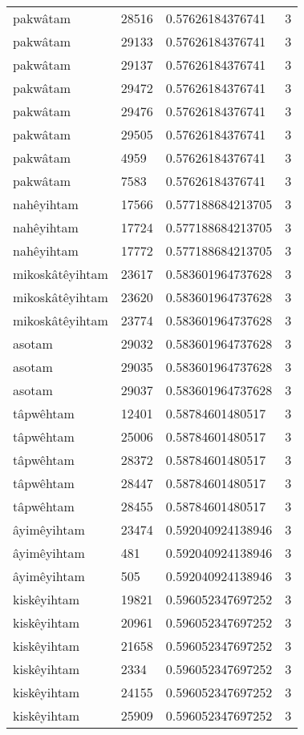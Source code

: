 \begin{longtable}{llll}
pakwâtam & 28516 & 0.57626184376741 & 3 \\
pakwâtam & 29133 & 0.57626184376741 & 3 \\
pakwâtam & 29137 & 0.57626184376741 & 3 \\
pakwâtam & 29472 & 0.57626184376741 & 3 \\
pakwâtam & 29476 & 0.57626184376741 & 3 \\
pakwâtam & 29505 & 0.57626184376741 & 3 \\
pakwâtam & 4959 & 0.57626184376741 & 3 \\
pakwâtam & 7583 & 0.57626184376741 & 3 \\
nahêyihtam & 17566 & 0.577188684213705 & 3 \\
nahêyihtam & 17724 & 0.577188684213705 & 3 \\
nahêyihtam & 17772 & 0.577188684213705 & 3 \\
mikoskâtêyihtam & 23617 & 0.583601964737628 & 3 \\
mikoskâtêyihtam & 23620 & 0.583601964737628 & 3 \\
mikoskâtêyihtam & 23774 & 0.583601964737628 & 3 \\
asotam & 29032 & 0.583601964737628 & 3 \\
asotam & 29035 & 0.583601964737628 & 3 \\
asotam & 29037 & 0.583601964737628 & 3 \\
tâpwêhtam & 12401 & 0.58784601480517 & 3 \\
tâpwêhtam & 25006 & 0.58784601480517 & 3 \\
tâpwêhtam & 28372 & 0.58784601480517 & 3 \\
tâpwêhtam & 28447 & 0.58784601480517 & 3 \\
tâpwêhtam & 28455 & 0.58784601480517 & 3 \\
âyimêyihtam & 23474 & 0.592040924138946 & 3 \\
âyimêyihtam & 481 & 0.592040924138946 & 3 \\
âyimêyihtam & 505 & 0.592040924138946 & 3 \\
kiskêyihtam & 19821 & 0.596052347697252 & 3 \\
kiskêyihtam & 20961 & 0.596052347697252 & 3 \\
kiskêyihtam & 21658 & 0.596052347697252 & 3 \\
kiskêyihtam & 2334 & 0.596052347697252 & 3 \\
kiskêyihtam & 24155 & 0.596052347697252 & 3 \\
kiskêyihtam & 25909 & 0.596052347697252 & 3 \\

\end{longtable}
